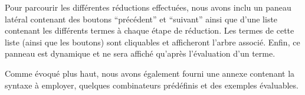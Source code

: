 \documentclass[a4paper, 11pt]{report}
\begin{document}
Pour parcourir les différentes réductions effectuées, nous avons inclu
un paneau latéral contenant des boutons ``précédent'' et ``suivant''
ainsi que d'une liste contenant les différents termes à chaque étape
de réduction. Les termes de cette liste (ainsi que les boutons) sont
cliquables et afficheront l'arbre associé. Enfin, ce panneau est
dynamique et ne sera affiché qu'après l'évaluation d'un terme.

Comme évoqué plus haut, nous avons également fourni une annexe
contenant la syntaxe à employer, quelques combinateurs prédéfinis
et des exemples évaluables.
\end{document}
